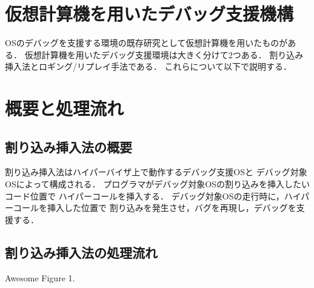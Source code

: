 \documentclass[tanilab-enum]{graduate}
\begin{document}
\section{仮想計算機を用いたデバッグ支援機構}
OSのデバッグを支援する環境の既存研究として仮想計算機を用いたものがある．
仮想計算機を用いたデバッグ支援環境は大きく分けて2つある．
割り込み挿入法とロギング/リプレイ手法である．
これらについて以下で説明する．
\section{概要と処理流れ}
    \subsection{割り込み挿入法の概要}
        割り込み挿入法はハイパーバイザ上で動作するデバッグ支援OSと
        デバッグ対象OSによって構成される．
        プログラマがデバッグ対象OSの割り込みを挿入したいコード位置で
        ハイパーコールを挿入する．
        デバッグ対象OSの走行時に，ハイパーコールを挿入した位置で
        割り込みを発生させ，バグを再現し，デバッグを支援する．
    \subsection{割り込み挿入法の処理流れ}
    {Awesome Figure 1.}
\end{document}
